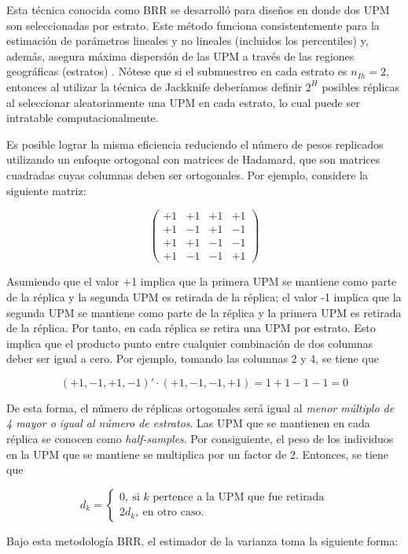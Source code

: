 \documentclass[
  12pt,
  spanish,
]{book}
\begin{document}
Esta técnica conocida como BRR se desarrolló para diseños en donde dos UPM son seleccionadas por estrato. Este método funciona consistentemente para la estimación de parámetros lineales y no lineales (incluidos los percentiles) y, además, asegura máxima dispersión de las UPM a través de las regiones geográficas (estratos) \citep{Valliant_Dever_2017}. Nótese que si el submuestreo en cada estrato es \(n_{Ih} = 2\), entonces al utilizar la técnica de Jackknife deberíamos definir \(2^H\) posibles réplicas al seleccionar aleatoriamente una UPM en cada estrato, lo cual puede ser intratable computacionalmente.

Es posible lograr la misma eficiencia reduciendo el número de pesos replicados utilizando un enfoque ortogonal con matrices de Hadamard, que son matrices cuadradas cuyas columnas deben ser ortogonales. Por ejemplo, considere la siguiente matriz:

\[
\begin{pmatrix}
+1 & +1 & +1 & +1 \\
+1 & -1 & +1 & -1 \\
+1 & +1 & -1 & -1 \\
+1 & -1 & -1 & +1
\end{pmatrix}
\]

Asumiendo que el valor +1 implica que la primera UPM se mantiene como parte de la réplica y la segunda UPM es retirada de la réplica; el valor -1 implica que la segunda UPM se mantiene como parte de la réplica y la primera UPM es retirada de la réplica. Por tanto, en cada réplica se retira una UPM por estrato. Esto implica que el producto punto entre cualquier combinación de dos columnas deber ser igual a cero. Por ejemplo, tomando las columnas 2 y 4, se tiene que

\[
(+1, -1, +1, -1)' \cdot (+1, -1, -1, +1) 
=  1 + 1 - 1 -1 = 0 
\]

De esta forma, el número de réplicas ortogonales será igual al \emph{menor múltiplo de 4 mayor o igual al número de estratos}. Las UPM que se mantienen en cada réplica se conocen como \emph{half-samples}. Por consiguiente, el peso de los individuos en la UPM que se mantiene se multiplica por un factor de 2. Entonces, se tiene que

\[
d_{k} = 
\begin{cases}
0, \ \text{si $k$ pertence a la UPM que fue retirada}\\
2d_k, \ \text{en otro caso.}
\end{cases}
\]

Bajo esta metodología BRR, el estimador de la varianza toma la siguiente forma:
\end{document}
